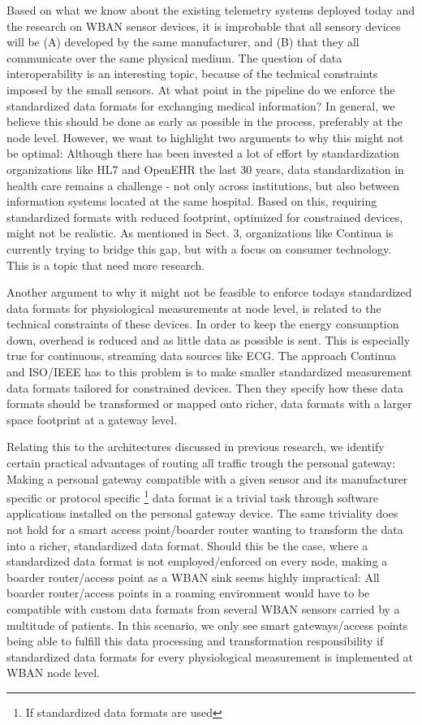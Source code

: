 Based on what we know about the existing telemetry systems deployed today and the research on WBAN sensor devices, it is improbable that all sensory devices will be (A) developed by the same manufacturer, and (B) that they all communicate over the same physical medium. The question of data interoperability is an interesting topic, because of the technical constraints imposed by the small sensors. At what point in the pipeline do we enforce the standardized data formats for exchanging medical information? In general, we believe this should be done as early as possible in the process, preferably at the node level. However, we want to highlight two arguments to why this might not be optimal: Although there has been invested a lot of effort by standardization organizations like HL7 and OpenEHR the last 30 years, data standardization in health care remains a challenge - not only across institutions, but also between information systems located at the same hospital. Based on this, requiring standardized formats with reduced footprint, optimized for constrained devices, might not be realistic. As mentioned in Sect. 3, organizations like Continua is currently trying to bridge this gap, but with a focus  on consumer technology. This is a topic that need more research.

Another argument to why it might not be feasible to enforce todays standardized data formats for physiological measurements at node level, is related to the technical constraints of these devices. In order to keep the energy consumption down, overhead is reduced and as little data as possible is sent. This is especially true for continuous, streaming data sources like ECG. The approach Continua and ISO/IEEE has to this problem is to make smaller standardized measurement data formats tailored for constrained devices. Then they specify how these data formats should be transformed or mapped onto richer, data formats with a larger space footprint at a gateway level.

Relating this to the architectures discussed in previous research, we identify certain practical advantages of routing all traffic trough the personal gateway: Making a personal gateway compatible with a given sensor and its manufacturer specific or protocol specific \footnote{If standardized data formats are used} data format is a trivial task through software applications installed on the personal gateway device. The same triviality does not hold for a smart access point/boarder router wanting to transform the data into a richer, standardized data format. Should this be the case, where a standardized data format is not employed/enforced on every node, making a boarder router/access point as a WBAN sink seems highly impractical: All boarder router/access points in a roaming environment would have to be compatible with custom data formats from several WBAN sensors carried by a multitude of patients. In this scenario, we only see smart gateways/access points being able to fulfill this data processing and transformation responsibility if standardized data formats for every physiological measurement is implemented at WBAN node level.

